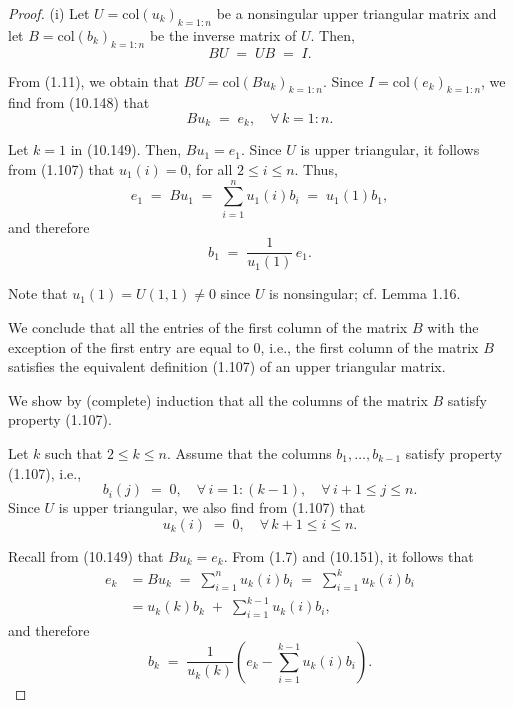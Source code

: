 \begin{proof}
(i) Let $U = \mathrm{col}(u_k)_{k=1:n}$ be a nonsingular upper triangular matrix and
let $B = \mathrm{col}(b_k)_{k=1:n}$ be the inverse matrix of $U$. Then,
\begin{equation}
BU \;=\; UB \;=\; I.
\end{equation}

From (1.11), we obtain that $BU = \mathrm{col}(Bu_k)_{k=1:n}$. Since $I =
\mathrm{col}(e_k)_{k=1:n}$, we find from (10.148) that
\begin{equation}
Bu_k \;=\; e_k, \quad \forall\, k = 1:n.
\end{equation}

Let $k=1$ in (10.149). Then, $Bu_1 = e_1$. Since $U$ is upper triangular, it
follows from (1.107) that $u_1(i) = 0$, for all $2 \le i \le n$. Thus,
\[
e_1 \;=\; Bu_1 \;=\; \sum_{i=1}^n u_1(i)b_i \;=\; u_1(1)b_1,
\]
and therefore
\[
b_1 \;=\; \frac{1}{u_1(1)}\,e_1.
\]

Note that $u_1(1) = U(1,1) \ne 0$ since $U$ is nonsingular; cf. Lemma 1.16.

We conclude that all the entries of the first column of the matrix $B$ with the
exception of the first entry are equal to 0, i.e., the first column of the matrix
$B$ satisfies the equivalent definition (1.107) of an upper triangular matrix.

We show by (complete) induction that all the columns of the matrix $B$ satisfy
property (1.107).

Let $k$ such that $2 \le k \le n$. Assume that the columns $b_1, \ldots, b_{k-1}$
satisfy property (1.107), i.e.,
\begin{equation}
b_i(j) \;=\; 0, \quad \forall\, i = 1:(k-1), \quad \forall\, i+1 \le j \le n.
\end{equation}
Since $U$ is upper triangular, we also find from (1.107) that
\begin{equation}
u_k(i) \;=\; 0, \quad \forall\, k+1 \le i \le n.
\end{equation}

Recall from (10.149) that $Bu_k = e_k$. From (1.7) and (10.151), it follows that
\begin{align*}
e_k &= Bu_k \;=\; \sum_{i=1}^n u_k(i)b_i \;=\; \sum_{i=1}^k u_k(i)b_i \\
&= u_k(k)b_k \;+\; \sum_{i=1}^{k-1} u_k(i)b_i,
\end{align*}
and therefore
\begin{equation}
b_k \;=\; \frac{1}{u_k(k)}\left(e_k - \sum_{i=1}^{k-1} u_k(i)b_i\right).
\end{equation}


\end{proof}
